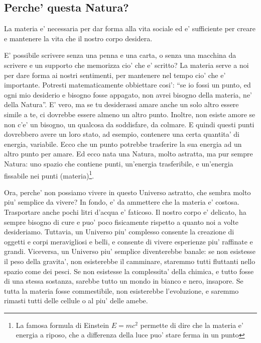 \subsection{Perche' questa Natura?}
La materia e' necessaria per dar forma alla vita sociale ed e' sufficiente per creare e mantenere la vita che il nostro corpo desidera.

E' possibile scrivere senza una penna e una carta, o senza una macchina da scrivere e un supporto che memorizza cio' che e' scritto? 
La materia serve a noi per dare forma ai nostri sentimenti, per mantenere nel tempo cio' che e' importante. Potresti matematicamente obbiettare cosi': ``se io fossi un punto, ed ogni mio desiderio e bisogno fosse appagato, non avrei bisogno della materia, ne' della Natura''. E' vero, ma se tu desiderassi amare anche un solo altro essere simile a te, ci dovrebbe essere almeno un altro punto. Inoltre, non esiste amore se non c'e' un bisogno, un qualcosa da soddisfare, da colmare. E quindi questi punti dovrebbero avere un loro stato, ad esempio, contenere una certa quantita' di energia, variabile. Ecco che un punto potrebbe trasferire la sua energia ad un altro punto per amare. Ed ecco nata una Natura, molto astratta, ma pur sempre Natura: uno spazio che contiene punti, un'energia trasferibile, e un'energia fissabile nei punti (materia)\footnote{La famosa formula di Einstein $E=mc^2$ permette di dire che la materia e' energia a riposo, che a differenza della luce puo' stare ferma in un punto}.

Ora, perche' non possiamo vivere in questo Universo astratto, che sembra molto piu' semplice da vivere? In fondo, e' da ammettere che la materia e' costosa. Trasportare anche pochi litri d'acqua e' faticoso. Il nostro corpo e' delicato, ha sempre bisogno di cure e puo' poco fisicamente rispetto a quanto noi a volte desideriamo. Tuttavia, un Universo piu' complesso consente la creazione di oggetti e corpi meravigliosi e belli, e consente di vivere esperienze piu' raffinate e grandi. Viceversa, un Universo piu' semplice diventerebbe banale: se non esistesse il peso della gravita', non esisterebbe il camminare, staremmo tutti fluttanti nello spazio come dei pesci. Se non esistesse la complessita' della chimica, e tutto fosse di una stessa sostanza, sarebbe tutto un mondo in bianco e nero, insapore. Se tutta la materia fosse commestibile, non esisterebbe l'evoluzione, e saremmo rimasti tutti delle cellule o al piu' delle amebe. 

